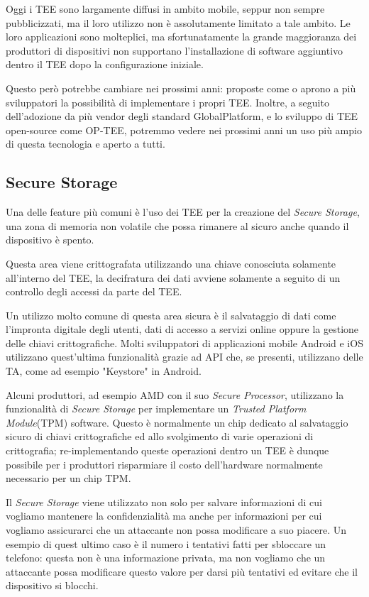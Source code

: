\documentclass[12pt,italian]{report}
\begin{document}
Oggi i TEE sono largamente diffusi in ambito mobile, seppur non sempre
pubblicizzati, ma il loro utilizzo non è assolutamente limitato a tale ambito.
Le loro applicazioni sono molteplici, ma sfortunatamente la grande
maggioranza dei produttori di dispositivi non supportano
l'installazione di software aggiuntivo dentro il TEE dopo la
configurazione iniziale.

Questo però potrebbe cambiare nei prossimi anni: proposte come
\cite{kohlbrenner2020opentees} o \cite{penglai} aprono a più sviluppatori la
possibilità di implementare i propri TEE.
Inoltre, a seguito dell'adozione da più vendor degli standard GlobalPlatform,
e lo sviluppo di TEE open-source come OP-TEE, potremmo vedere nei prossimi
anni un uso più ampio di questa tecnologia e aperto a tutti.

\subsection{Secure Storage}
\label{subsec:secure-storage}
Una delle feature più comuni è l'uso dei TEE per la creazione del
\textit{Secure Storage}, una zona di memoria non volatile che possa rimanere
al sicuro anche quando il dispositivo è spento.

Questa area viene crittografata utilizzando una chiave conosciuta solamente
all'interno del TEE, la decifratura dei dati avviene solamente a seguito di
un controllo degli accessi da parte del TEE.

Un utilizzo molto comune di questa area sicura è il salvataggio di dati
come l'impronta digitale degli utenti, dati di accesso a servizi online
oppure la gestione delle chiavi crittografiche.
Molti sviluppatori di applicazioni mobile Android e iOS utilizzano
quest'ultima funzionalità grazie ad API che, se presenti, utilizzano delle
TA, come ad esempio "Keystore"\cite{androidkeystore} in Android.

Alcuni produttori, ad esempio AMD con il suo
\textit{Secure Processor}, utilizzano la
funzionalità di \textit{Secure Storage} per implementare un
\textit{Trusted Platform Module}(TPM) software\cite{amd2020ftpm}.
Questo è normalmente un chip dedicato al salvataggio sicuro di chiavi crittografiche
ed allo svolgimento di varie operazioni di crittografia; re-implementando
queste operazioni dentro un TEE è dunque possibile per i produttori risparmiare
il costo dell'hardware normalmente necessario per un chip TPM.

Il \textit{Secure Storage} viene utilizzato non solo per salvare
informazioni di cui vogliamo mantenere la confidenzialità ma anche per
informazioni per cui vogliamo assicurarci che un attaccante non possa
modificare a suo piacere.
Un esempio di quest ultimo caso è il numero i tentativi fatti per sbloccare
un telefono: questa non è una informazione privata, ma non vogliamo che un
attaccante possa modificare questo valore per darsi più tentativi ed evitare
che il dispositivo si blocchi.
\end{document}
